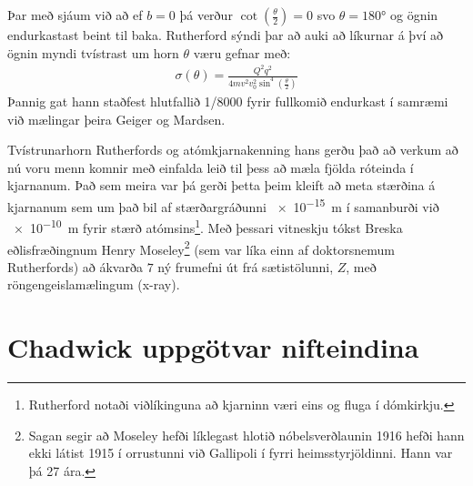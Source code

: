 \ifdefined \wholebook \else\documentclass[oneside]{book}\usepackage{EdlBook}\graphicspath{{figures/}}
\begin{document}
\begin{figure}[H]
    \centering
{}
\end{figure}
Þar með sjáum við að ef $b = 0$ þá verður $\cot(\frac{\theta}{2}) = 0$ svo $\theta = \ang{180}$ og ögnin endurkastast beint til baka. Rutherford sýndi þar að auki að líkurnar á því að ögnin myndi tvístrast um horn $\theta$ væru gefnar með:
\begin{align*}
    \sigma(\theta) = \frac{Q^2q^2}{4mv^2v_0^2\sin^4(\frac{\theta}{2})}
\end{align*}
Þannig gat hann staðfest hlutfallið 1/8000 fyrir fullkomið endurkast í samræmi við mælingar þeira Geiger og Mardsen.

Tvístrunarhorn Rutherfords og atómkjarnakenning hans gerðu það að verkum að nú voru menn komnir með einfalda leið til þess að mæla fjölda róteinda í kjarnanum. Það sem meira var þá gerði þetta þeim kleift að meta stærðina á kjarnanum sem um það bil af stærðargráðunni \SI{e-15}{m} í samanburði við \SI{e-10}{m} fyrir stærð atómsins\footnote{Rutherford notaði viðlíkinguna að kjarninn væri eins og fluga í dómkirkju.}. Með þessari vitneskju tókst Breska eðlisfræðingnum Henry Moseley\footnote{Sagan segir að Moseley hefði líklegast hlotið nóbelsverðlaunin 1916 hefði hann ekki látist 1915 í orrustunni við Gallipoli í fyrri heimsstyrjöldinni. Hann var þá 27 ára.} (sem var líka einn af doktorsnemum Rutherfords) að ákvarða $7$ ný frumefni út frá sætistölunni, $Z$, með röngengeislamælingum (x-ray). \\

\section{Chadwick uppgötvar nifteindina}
\end{document}
